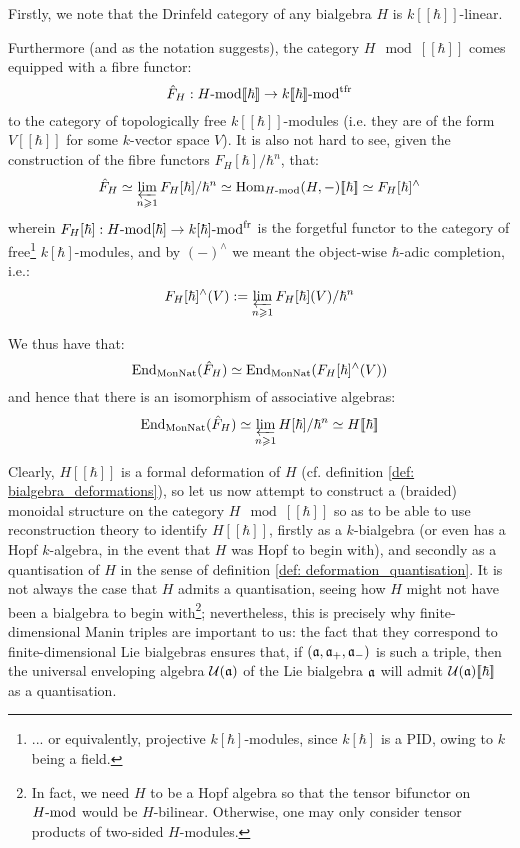         \begin{remark} \label{remark: formal_properties_of_drinfeld_categories}
            Firstly, we note that the Drinfeld category of any bialgebra $H$ is $k[\![\hbar]\!]$-linear.
            
            Furthermore (and as the notation suggests), the category $H\mod[\![\hbar]\!]$ comes equipped with a fibre functor:
                $$\hat{F}_H: H\mod[\![\hbar]\!] \to k[\![\hbar]\!]\mod^{\tfr}$$
            to the category of topologically free $k[\![\hbar]\!]$-modules (i.e. they are of the form $V[\![\hbar]\!]$ for some $k$-vector space $V$). It is also not hard to see, given the construction of the fibre functors $F_H[\hbar]/\hbar^n$, that:
                $$\hat{F}_H \cong \projlim_{n \geq 1} F_H[\hbar]/\hbar^n \cong \Hom_{H\mod}(H, -)[\![\hbar]\!] \cong F_H[\hbar]^{\wedge}$$
            wherein $F_H[\hbar]: H\mod[\hbar] \to k[\hbar]\mod^{\fr}$ is the forgetful functor to the category of free\footnote{... or equivalently, projective $k[\hbar]$-modules, since $k[\hbar]$ is a PID, owing to $k$ being a field.} $k[\hbar]$-modules, and by $(-)^{\wedge}$ we meant the object-wise $\hbar$-adic completion, i.e.:
                $$F_H[\hbar]^{\wedge}(V) := \projlim_{n \geq 1} F_H[\hbar](V)/\hbar^n$$
            
            We thus have that:
                $$\End_{\Mon\Nat}(\hat{F}_H) \cong \End_{\Mon\Nat}(F_H[\hbar]^{\wedge}(V))$$
            and hence that there is an isomorphism of associative algebras:
                $$\End_{\Mon\Nat}(\hat{F}_H) \cong \projlim_{n \geq 1} H[\hbar]/\hbar^n \cong H[\![\hbar]\!]$$
        \end{remark}
        Clearly, $H[\![\hbar]\!]$ is a formal deformation of $H$ (cf. definition \ref{def: bialgebra_deformations}), so let us now attempt to construct a (braided) monoidal structure on the category $H\mod[\![\hbar]\!]$ so as to be able to use reconstruction theory to identify $H[\![\hbar]\!]$, firstly as a $k$-bialgebra (or even has a Hopf $k$-algebra, in the event that $H$ was Hopf to begin with), and secondly as a quantisation of $H$ in the sense of definition \ref{def: deformation_quantisation}. It is not always the case that $H$ admits a quantisation, seeing how $H$ might not have been a bialgebra to begin with\footnote{In fact, we need $H$ to be a Hopf algebra so that the tensor bifunctor on $H\mod$ would be $H$-bilinear. Otherwise, one may only consider tensor products of two-sided $H$-modules.}; nevertheless, this is precisely why finite-dimensional Manin triples are important to us: the fact that they correspond to finite-dimensional Lie bialgebras ensures that, if $(\a, \a_+, \a_-)$ is such a triple, then the universal enveloping algebra $\calU(\a)$ of the Lie bialgebra $\a$ will admit $\calU(\a)[\![\hbar]\!]$ as a quantisation.

